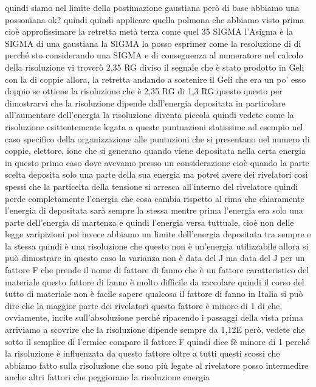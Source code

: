 quindi siamo nel limite della postimazione gaustiana però di base abbiamo una possoniana ok? quindi quindi applicare quella polmona che abbiamo visto prima cioè approfissimare la retretta metà terza come quel 35 SIGMA l'Asigma è la SIGMA di una gaustiana la SIGMA la posso esprimer come la resoluzione di di perché sto considerando una SIGMA e di conseguenza al numeratore nel calcolo della risoluzione vi troverò 2,35 RG diviso il segnale che è stato prodotto in Geli con la di coppie allora, la retretta andando a sostenire il Geli che era un po' esso doppio se ottiene la risoluzione che è 2,35 RG di 1,3 RG questo questo per dimostrarvi che la risoluzione dipende dall'energia depositata in particolare all'aumentare dell'energia la risoluzione diventa piccola quindi vedete come la risoluzione esittentemente legata a queste puntuazioni statissime ad esempio nel caso specifico della organizzazione alle puntuzioni che si presentano nel numero di coppie, elettore, ione che si generano quando viene depositata nella certa energia in questo primo caso dove avevamo presso un considerazione cioè quando la parte scelta deposita solo una parte della sua energia ma potrei avere dei rivelatori così spessi che la particelta della tensione si arresca all'interno del rivelatore quindi perde completamente l'energia che cosa cambia rispetto al rima che chiaramente l'energia di depositata sarà sempre la stessa mentre prima l'energia era solo una parte dell'energia di martenza e quindi l'energia versa tuttuale, cioè non delle legge varipizioni poi invece abbiamo un limite dell'energia depositata tra sempre e la stessa quindi è una risoluzione che questo non è un'energia utilizzabile allora si può dimostrare in questo caso la varianza non è data del J ma data del J per un fattore F che prende il nome di fattore di fanno che è un fattore caratteristico del materiale questo fattore di fanno è molto difficile da raccolare quindi il corso del tutto di materiale non è facile sapere qualcosa il fattore di fanno in Italia si può dire che la maggior parte dei rivelatori questo fattore è minore di 1 di che, ovviamente, incite sull'absoluzione perché ripacendo i passaggi della vista prima arriviamo a scovrire che la risoluzione dipende sempre da 1,12E però, vedete che sotto il semplice di l'ermice compare il fattore F quindi dice fè minore di 1 perché la risoluzione è influenzata da questo fattore oltre a tutti questi scossi che abbiamo fatto sulla risoluzione che sono più legate al rivelatore posso intermedire anche altri fattori che peggiorano la risoluzione energia 

